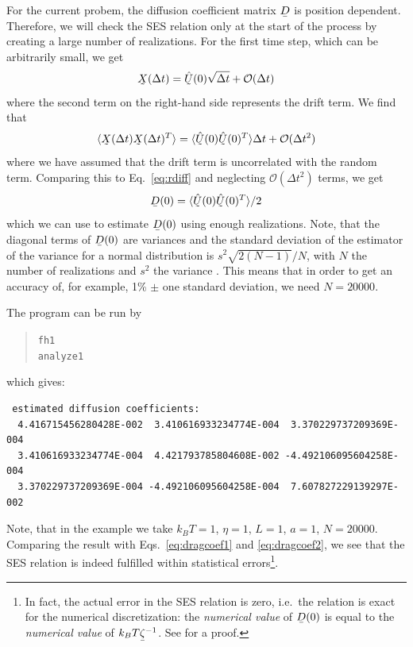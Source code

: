 For the current probem, the diffusion coefficient matrix $\mat D$ is position dependent. Therefore, we
will check the SES relation only at the start of the
process by creating a large number of realizations. For the first time step,
which can be arbitrarily small, we get
\begin{equation}
\col X(\Delta t)=\col{\hat U}(0)\sqrt{\Delta t} + \mathcal{O}(\Delta t)
\end{equation}
where the second term on the right-hand side represents the drift term.
We find that
\begin{equation}
   \langle \col X(\Delta t) \col X(\Delta t)^T \rangle = 
       \langle \col{\hat U}(0) \col{\hat U}(0)^T\rangle\Delta t + \mathcal{O}(\Delta t^2)
\end{equation}
where we have assumed that the drift term is uncorrelated with the random term.
Comparing this to Eq.~\eqref{eq:rdiff} and neglecting $\mathcal{O}(\Delta t^2)$ terms, we get
\begin{equation}
   \mat D(0) = \langle \col{\hat U}(0) \col{\hat U}(0)^T \rangle / 2
\end{equation}
which we can use to estimate $\mat D(0)$ using enough realizations. Note, that
the diagonal terms of $\mat D(0)$ are variances and the standard deviation of
the estimator of the variance for a normal distribution is 
$s^2\sqrt{2(N-1)}/N$, with $N$ the number of realizations and $s^2$ the
variance \cite{Weisstein1}.
This means that in order to get an accuracy of, for example,
1\% $\pm$ one standard deviation, we need $N=20000$.

The program can be run by
\begin{quote}
  \texttt{fh1}\\
  \texttt{analyze1}
\end{quote}
which gives:
\begin{verbatim}
 estimated diffusion coefficients:
  4.416715456280428E-002  3.410616933234774E-004  3.370229737209369E-004
  3.410616933234774E-004  4.421793785804608E-002 -4.492106095604258E-004
  3.370229737209369E-004 -4.492106095604258E-004  7.607827229139297E-002
\end{verbatim}
Note, that in the example we take $k_BT=1$, $\eta=1$, $L=1$, $a=1$, $N=20000$.
Comparing
the result with
Eqs.~\eqref{eq:dragcoef1} and \eqref{eq:dragcoef2}, we see that the
SES relation is indeed fulfilled within statistical
errors\footnote{In fact,
the actual error in the SES
relation is zero, i.e.\ the relation is exact for the numerical
discretization: the \emph{numerical value} of $\mat D(0)$ is equal to the
\emph{numerical value} of $k_BT\mat \zeta^{-1}$.
 See \cite{DeCorato2016} for a proof.}.


